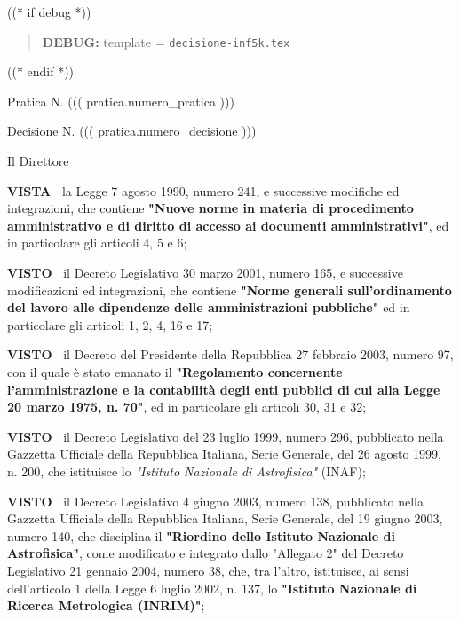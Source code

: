 \documentclass[a4paper,12pt]{letter}
\begin{document}
\topaddr

((* if debug *))
\begin{quotation}
	\textbf{DEBUG:} template = \texttt{decisione-inf5k.tex}
\end{quotation}
((* endif *))

Pratica N. ((( pratica.numero_pratica )))

\begin{flushright}
Decisione N. ((( pratica.numero_decisione )))
\end{flushright}

\begin{center}

Il Direttore

\end{center}
\textbf{VISTA~}	la Legge 7 agosto 1990, numero 241, e successive modifiche
ed integrazioni, che contiene \textbf{"Nuove norme in materia di procedimento
amministrativo e di diritto di accesso ai documenti amministrativi"},
ed in particolare gli articoli 4, 5 e 6;

\textbf{VISTO~}	il Decreto Legislativo 30 marzo 2001, numero 165, e
successive modificazioni ed integrazioni, che contiene \textbf{"Norme generali
sull’ordinamento del lavoro alle dipendenze delle amministrazioni
pubbliche"} ed in particolare gli articoli 1, 2, 4, 16 e 17;

\textbf{VISTO~}	il Decreto del Presidente della Repubblica 27 febbraio
2003, numero 97, con il quale è stato emanato il \textbf{"Regolamento concernente
l’amministrazione e la contabilità degli enti pubblici di cui alla
Legge 20 marzo 1975, n. 70"}, ed in particolare gli articoli 30, 31 e 32;

\textbf{VISTO~}	il Decreto Legislativo del 23 luglio 1999, numero 296,
pubblicato nella Gazzetta Ufficiale della Repubblica Italiana, Serie
Generale, del 26 agosto 1999, n. 200, che istituisce lo \textit{"Istituto
Nazionale di Astrofisica"} (INAF);

\textbf{VISTO~}	il Decreto Legislativo 4 giugno 2003, numero 138,
pubblicato nella Gazzetta Ufficiale della Repubblica Italiana, Serie
Generale, del 19 giugno 2003, numero 140, che disciplina il \textbf{"Riordino
dello Istituto Nazionale di Astrofisica"}, come modificato e integrato
dallo "Allegato 2" del Decreto Legislativo 21 gennaio 2004, numero 38,
che, tra l’altro, istituisce, ai sensi dell’articolo 1 della Legge
6 luglio 2002, n. 137, lo \textbf{"Istituto Nazionale di Ricerca Metrologica
(INRIM)"};
\end{document}
